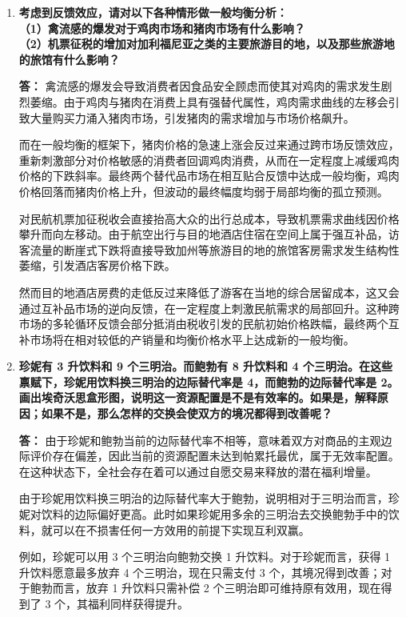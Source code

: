 \begin{enumerate}[label=\textbf{\arabic*.}, leftmargin=*]
		\item \textbf{考虑到反馈效应，请对以下各种情形做一般均衡分析：\\（1）禽流感的爆发对于鸡肉市场和猪肉市场有什么影响？\\（2）机票征税的增加对加利福尼亚之类的主要旅游目的地，以及那些旅游地的旅馆有什么影响？}
		
		\textbf{答：}
		禽流感的爆发会导致消费者因食品安全顾虑而使其对鸡肉的需求发生剧烈萎缩。由于鸡肉与猪肉在消费上具有强替代属性，鸡肉需求曲线的左移会引致大量购买力涌入猪肉市场，引发猪肉的需求增加与市场价格飙升。
		
		而在一般均衡的框架下，猪肉价格的急速上涨会反过来通过跨市场反馈效应，重新刺激部分对价格敏感的消费者回调鸡肉消费，从而在一定程度上减缓鸡肉价格的下跌斜率。最终两个替代品市场在相互贴合反馈中达成一般均衡，鸡肉价格回落而猪肉价格上升，但波动的最终幅度均弱于局部均衡的孤立预测。
		
		对民航机票加征税收会直接抬高大众的出行总成本，导致机票需求曲线因价格攀升而向左移动。由于航空出行与目的地酒店住宿在空间上属于强互补品，访客流量的断崖式下跌将直接导致加州等旅游目的地的旅馆客房需求发生结构性萎缩，引发酒店客房价格下跌。
		
		然而目的地酒店房费的走低反过来降低了游客在当地的综合居留成本，这又会通过互补品市场的逆向反馈，在一定程度上刺激民航需求的局部回升。这种跨市场的多轮循环反馈会部分抵消由税收引发的民航初始价格跌幅，最终两个互补市场将在相对较低的产销量和均衡价格水平上达成新的一般均衡。
		
		\item \textbf{珍妮有 3 升饮料和 9 个三明治。而鲍勃有 8 升饮料和 4 个三明治。在这些禀赋下，珍妮用饮料换三明治的边际替代率是 4，而鲍勃的边际替代率是 2。画出埃奇沃思盒形图，说明这一资源配置是不是有效率的。如果是，解释原因；如果不是，那么怎样的交换会使双方的境况都得到改善呢？}
		
		\textbf{答：}
		由于珍妮和鲍勃当前的边际替代率不相等，意味着双方对商品的主观边际评价存在偏差，因此当前的资源配置未达到帕累托最优，属于无效率配置。在这种状态下，全社会存在着可以通过自愿交易来释放的潜在福利增量。
		
		由于珍妮用饮料换三明治的边际替代率大于鲍勃，说明相对于三明治而言，珍妮对饮料的边际偏好更高。此时如果珍妮用多余的三明治去交换鲍勃手中的饮料，就可以在不损害任何一方效用的前提下实现互利双赢。
		
		例如，珍妮可以用 3 个三明治向鲍勃交换 1 升饮料。对于珍妮而言，获得 1 升饮料愿意最多放弃 4 个三明治，现在只需支付 3 个，其境况得到改善；对于鲍勃而言，放弃 1 升饮料只需补偿 2 个三明治即可维持原有效用，现在得到了 3 个，其福利同样获得提升。
		

\end{enumerate}
